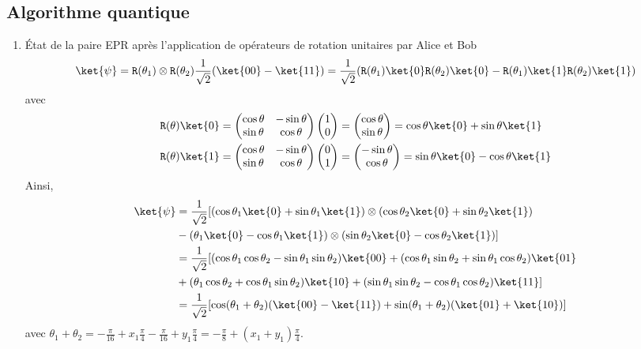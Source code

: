 \subsection{Algorithme quantique}

\begin{enumerate}
 \item État de la paire
EPR après l'application de opérateurs de rotation unitaires par Alice et Bob
 \begin{equation}
\ket{\psi}=\mathtt{R}(\theta_1)\otimes \mathtt{R}(\theta_2)\frac{1}
{\sqrt{2}}(\ket{00}-\ket{11})=\frac{1}{\sqrt{2}}(\mathtt{R}(\theta_1)
\ket{0}\mathtt{R}(\theta_2)\ket{0}-\mathtt{R}(\theta_1)\ket{1}
\mathtt{R}(\theta_2)\ket{1})
 \end{equation}
avec
\begin{align}
\mathtt{R}(\theta)\ket{0} & =\begin{pmatrix}
\cos\theta & -\sin\theta\\
\sin\theta & \cos\theta
\end{pmatrix}
\begin{pmatrix}
1\\
0
\end{pmatrix}
=\begin{pmatrix}
\cos\theta\\
\sin\theta
\end{pmatrix}
=\cos\theta\ket{0}+\sin\theta\ket{1}\\
\mathtt{R}(\theta)\ket{1} &=\begin{pmatrix}
\cos\theta & -\sin\theta\\
\sin\theta & \cos\theta
\end{pmatrix}%
\begin{pmatrix}
0\\
1
\end{pmatrix}
=\begin{pmatrix}
-\sin\theta\\
\cos\theta
\end{pmatrix}
=\sin\theta\ket{0} -\cos\theta\ket{1}
\end{align}
Ainsi,
\begin{equation}
\begin{split}
\ket{\psi} &=\frac{1}{\sqrt{2}}[(\cos\theta_1\ket{0} +\sin\theta_1
\ket{1})\otimes(\cos\theta_2\ket{0} +\sin\theta_2\ket{1}) \\
& -(\theta_1\ket{0} -\cos\theta_1\ket{1})\otimes(\sin\theta_2\ket{0}
-\cos\theta_2\ket{1})]\\
&  =\frac{1}{\sqrt{2}}[(\cos\theta_1\cos\theta_2-\sin\theta_1
\sin\theta_2)\ket{00}+(\cos\theta_1\sin\theta_2+\sin\theta_1\cos\theta_2
)\ket{01}
\\
& +(\theta_1\cos\theta_2+\cos\theta_1\sin\theta_2)\ket{10}
+(\sin\theta_1\sin\theta_2-\cos\theta_1\cos\theta_2)\ket{11}]\\
& =\frac{1}{\sqrt{2}}[\cos(\theta_1+\theta_2)(\ket{00}-\ket{11})
+\sin(\theta_1+\theta_2)(\ket{01}+\ket{10})]
\end{split}
\end{equation}
avec $\theta_1+\theta_2=-\frac{\pi}{16}+x_1\frac{\pi}{4}-\frac{\pi}
{16}+y_1\frac{\pi}{4}=-\frac{\pi}{8}+(x_1+y_1)\frac{\pi}{4}$.


\end{enumerate}
